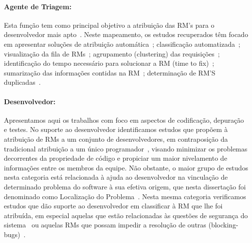 \paragraph{Agente de Triagem:} Esta função tem como principal objetivo a
atribuição das RM’s para o desenvolvedor mais apto~\cite{banitaan2013decoba}.
Neste mapeamento, os estudos recuperados têm focado em apresentar soluções de
atribuição automática~\cite{banitaan2013decoba, shokripour2012automatic,
	somasundaram2012automatic, Naguib2013, Zhang2014, Zanetti2013};
classificação automatizada~\cite{gegick2010identifying,liu2014faceted,
	behl2014bug, chawla2015automated,tian2015automated}; visualização da fila de
RMs~\cite{izquierdo2015gila}; agrupamento (clustering) das
requisições~\cite{liu2014faceted}; identificação do tempo necessário para
solucionar a RM (time to fix)~\cite{hosseini2012market,
	Bhattacharya:2011:BTP:1985441.1985472}; sumarização das informações contidas
na RM~\cite{mani2012ausum}; determinação de RM'S duplicadas~\cite{Sun2011,
	Wu2011a}.

\paragraph{Desenvolvedor:}

Apresentamos aqui os trabalhos com foco em aspectos de codificação, depuração e
testes. No suporte ao desenvolvedor identificamos estudos que propõem à
atribuição de RMs a um conjunto de desenvolvedores, em contraposição da
tradicional atribuição a um único programador~\cite{banitaan2013decoba}, visando
minimizar os pro\-ble\-mas decorrentes da propriedade de código e propiciar um
maior nivelamento de informações entre os membros da equipe. Não obstante, o
maior grupo de estudos nesta categoria está relacionada à ajuda ao desenvolvedor
na vinculação de determinado problema do software à sua efetiva origem, que
nesta dissertação foi denominado como Localização do
Problema~\cite{corley2011recovering,Wong:2014:BBF:2705615.2706096,
	Thung:2014:BIT:2635868.2661678,Nguyen:2012:MAR:2393596.2393671,thung2013automatic,
	Romo:2015:TAT:2745802.2745833}. Nesta mesma categoria verificamos estudos
que dão suporte ao desenvolvedor em classificar à RM que lhe foi atribuída, em
especial aquelas que estão relacionadas às questões de segurança do
sistema~\cite{gegick2010identifying} ou aquelas RMs que possam impedir a
resolução de outras
(blocking-bugs)~\cite{ValdiviaGarcia:2014:CPB:2597073.2597099}.

